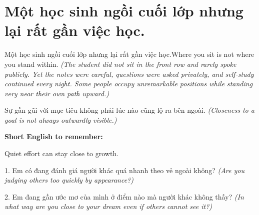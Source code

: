 \section{Một học sinh ngồi cuối lớp nhưng lại rất gần việc học.}
\begin{truyen}{Một học sinh ngồi cuối lớp nhưng lại rất gần việc học.}{Where you sit is not where you stand within.}
\textit{(The student did not sit in the front row and rarely spoke publicly. Yet the notes were careful, questions were asked privately, and self-study continued every night. Some people occupy unremarkable positions while standing very near their own path upward.)}
\end{truyen}
\begin{baihoc}
Sự gần gũi với mục tiêu không phải lúc nào cũng lộ ra bên ngoài.
\textit{(Closeness to a goal is not always outwardly visible.)}
\end{baihoc}
\begin{ghinhoanh}
\textbf{Short English to remember:}

Quiet effort can stay close to growth.
\end{ghinhoanh}
\begin{tuhocnhanh}
1. Em có đang đánh giá người khác quá nhanh theo vẻ ngoài không? \textit{(Are you judging others too quickly by appearance?)}

2. Em đang gần ước mơ của mình ở điểm nào mà người khác không thấy? \textit{(In what way are you close to your dream even if others cannot see it?)}
\end{tuhocnhanh}
\ngancach

